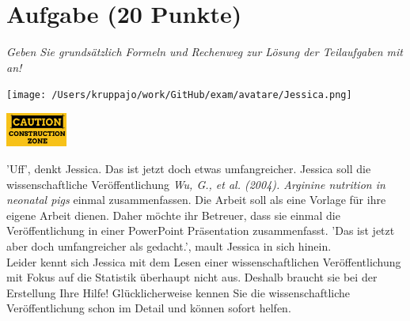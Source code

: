\documentclass[a4paper, 9pt]{scrartcl}\usepackage[]{graphicx}\usepackage[]{xcolor}
\begin{document}
\section{Aufgabe \hfill (20 Punkte)}

\textit{Geben Sie grundsätzlich Formeln und Rechenweg zur Lösung der Teilaufgaben mit an!} \\[1Ex]
 

 
\begin{minipage}[t]{0.5\textwidth}
\texttt{[image: /Users/kruppajo/work/GitHub/exam/avatare/Jessica.png]}
\end{minipage}
\begin{minipage}[t]{0.5\textwidth}
\hfill
\href{https://youtu.be/C9skfFRTHhI}{\includegraphics[width = 2cm]{img/caution}}
\end{minipage}
\vspace{1ex}



'Uff', denkt Jessica. Das ist jetzt doch etwas umfangreicher. Jessica soll die wissenschaftliche Veröffentlichung \textit{Wu, G., et al. (2004). Arginine nutrition in neonatal pigs} einmal zusammenfassen. Die Arbeit soll als eine Vorlage für ihre eigene Arbeit dienen. Daher möchte ihr Betreuer, dass sie einmal die Veröffentlichung in einer PowerPoint Präsentation zusammenfasst. 'Das ist jetzt aber doch umfangreicher als gedacht.', mault Jessica in sich hinein.\\

Leider kennt sich Jessica mit dem Lesen einer wissenschaftlichen Veröffentlichung mit Fokus auf die Statistik überhaupt nicht aus. Deshalb braucht sie bei der Erstellung Ihre Hilfe! Glücklicherweise kennen Sie die wissenschaftliche Veröffentlichung schon im Detail und können sofort helfen.
\end{document}
